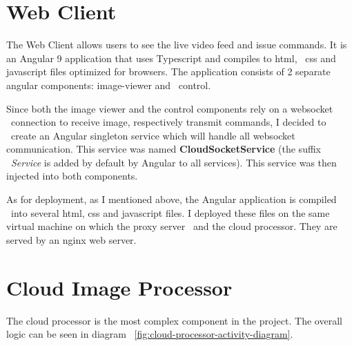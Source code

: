 \section{Web Client}
\label{sec:implementation-web-client}
The Web Client allows users to see the live video feed and issue commands.
It is an Angular 9 application that uses Typescript and compiles to html, \
css and javascript files optimized for browsers.
The application consists of 2 separate angular components: image-viewer and \
control.

Since both the image viewer and the control components rely on a websocket \
connection to receive image, respectively transmit commands, I decided to \
create an Angular singleton service which will handle all websocket communication.
This service was named \textbf{CloudSocketService} (the suffix \
\textit{Service} is added by default by Angular to all services).
This service was then injected into both components.

As for deployment, as I mentioned above, the Angular application is compiled \
into several html, css and javascript files.
I deployed these files on the same virtual machine on which the proxy server \
and the cloud processor.
They are served by an nginx web server.


\section{Cloud Image Processor}
\label{sec:implementation-cloud-processor}
The cloud processor is the most complex component in the project.
The overall logic can be seen in diagram ~\ref{fig:cloud-processor-activity-diagram}.

